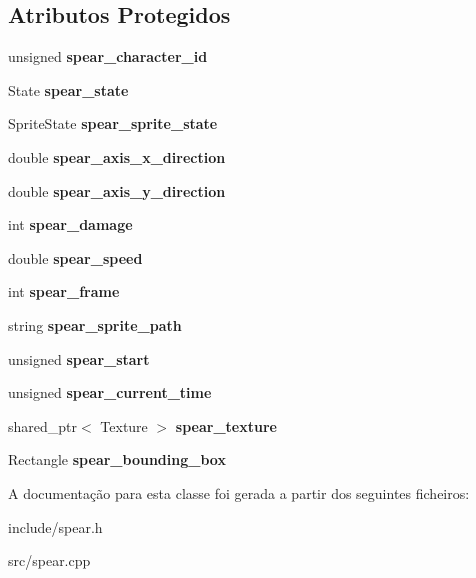 \subsection*{Atributos Protegidos}
\begin{DoxyCompactItemize}
\item 
\mbox{\label{classSpear_a89f70df449018b3870010c72f9ffaea0}} 
unsigned {\bfseries spear\+\_\+character\+\_\+id}
\item 
\mbox{\label{classSpear_ae921f354108401811fcd4cef9a9ee76f}} 
State {\bfseries spear\+\_\+state}
\item 
\mbox{\label{classSpear_a12887ba0f7fddb1d47c26a0efe6b2474}} 
Sprite\+State {\bfseries spear\+\_\+sprite\+\_\+state}
\item 
\mbox{\label{classSpear_a198f28ef2aabb1a9fc3013de7324070f}} 
double {\bfseries spear\+\_\+axis\+\_\+x\+\_\+direction}
\item 
\mbox{\label{classSpear_af716b055d0d37cdfb57ce1b2f352d712}} 
double {\bfseries spear\+\_\+axis\+\_\+y\+\_\+direction}
\item 
\mbox{\label{classSpear_a11e9f24256eeaa389eaf8af20f70fbe8}} 
int {\bfseries spear\+\_\+damage}
\item 
\mbox{\label{classSpear_abe9b7dfdc8334550b3c9a77df43accc0}} 
double {\bfseries spear\+\_\+speed}
\item 
\mbox{\label{classSpear_a78be675fb88ce69127afc65682f7c8d5}} 
int {\bfseries spear\+\_\+frame}
\item 
\mbox{\label{classSpear_a93eb583483f14338e8063baea9cdc7b1}} 
string {\bfseries spear\+\_\+sprite\+\_\+path}
\item 
\mbox{\label{classSpear_ab29788b30cc2545adad3cfad55c14307}} 
unsigned {\bfseries spear\+\_\+start}
\item 
\mbox{\label{classSpear_a112332750e8d8cf39ea335a93ffe5602}} 
unsigned {\bfseries spear\+\_\+current\+\_\+time}
\item 
\mbox{\label{classSpear_ab622ea5877722e47251e5d84fb87d35c}} 
shared\+\_\+ptr$<$ Texture $>$ {\bfseries spear\+\_\+texture}
\item 
\mbox{\label{classSpear_aeef3eeb6bbf4e92a65677f191ce04a68}} 
Rectangle {\bfseries spear\+\_\+bounding\+\_\+box}
\end{DoxyCompactItemize}


A documentação para esta classe foi gerada a partir dos seguintes ficheiros\+:\begin{DoxyCompactItemize}
\item 
include/spear.\+h\item 
src/spear.\+cpp\end{DoxyCompactItemize}
